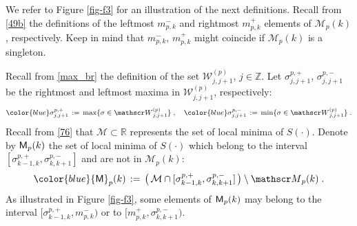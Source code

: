 \documentclass[reqno]{amsart}
\theoremstyle{plain}
\theoremstyle{definition}
\newcommand{\mc}[1]{{\mathcal #1}}
\newcommand{\bb}[1]{{\mathbb #1}}
\newcommand{\ms}[1]{{\mathscr #1}}
\newcommand{\mss}[1]{{\textsf #1}}
\newcommand{\<}{\langle}
\renewcommand{\>}{\rangle}
\begin{document}
We refer to Figure \ref{fig-f3} for an illustration of the next
definitions. Recall from \eqref{49b} the definitions of the leftmost
$m_{p,k}^-$ and rightmost $m_{p,k}^+$ elements of $\ms M_p(k)$,
respectively.  Keep in mind that $ m_{p,k}^-$, $ m_{p,k}^+$ might
coincide if $\ms M_{p}(k)$ is a singleton.

Recall from \eqref{max_br} the definition of the set
$\ms W^{(p)}_{j,j+1}$, $j\in \bb Z$.  Let $\sigma^{p,+}_{j, j+1}$,
$\sigma^{p,-}_{j, j+1}$ be the rightmost and leftmost maxima in
$\ms W^{(p)}_{j,j+1}$, respectively:
\begin{equation}
\label{64}
{\color{blue} \sigma^{p,+}_{j, j+1}} \,:=\,
\max\{\sigma\in \ms W^{(p)}_{j,j+1} \}\;,
\quad
{\color{blue}  \sigma^{p,-}_{j,j+1}}\, := \,
\min\{\sigma\in \ms W^{(p)}_{j,j+1}\}\;.
\end{equation}
Recall from \eqref{76} that $\mc M\subset \bb R$ represents the set of
local minima of $S(\cdot)$. Denote by $\mss M_p(k)$ the set of local
minima of $S(\cdot)$ which belong to the interval
$[\sigma^{p,+}_{k-1,k} , \sigma^{p,-}_{k,k+1}]$ and are not in
$\ms M_{p}(k)$:
\begin{equation*}
{\color{blue} \mss M_p(k) } \,:=\,
\big(\, \mc M \cap [\sigma^{p,+}_{k-1,k} ,
\sigma^{p,-}_{k,k+1}] \,\big)  \setminus \ms M_{p}(k) \;.
\end{equation*}
As illustrated in Figure \ref{fig-f3}, some elements of $\mss M_p(k)$
may belong to the interval $[\sigma^{p,+}_{k-1, k}, m^-_{p,k})$ or to
$[m^+_{p,k}, \sigma^{p,-}_{k,k+1})$.
\end{document}
